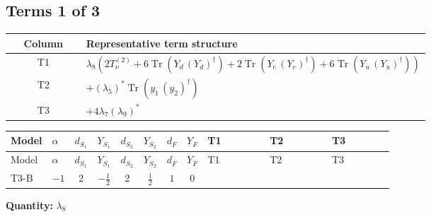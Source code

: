 \documentclass[8pt]{article}
\begin{document}
\begin{landscape}
\subsection*{Terms 1 of 3}
\begin{center}
\begin{tabular}{@{}c >{\raggedright\arraybackslash}p{0.82\linewidth}@{}}
\toprule
Column & Representative term structure \\
\midrule
T1 & \(\displaystyle {\lambda_{8}} (2 T_{\nu}^{(2)}+6 \operatorname{Tr}\!\left({Y_d}\,\left({Y_d}\right)^{\dagger}\right)+2 \operatorname{Tr}\!\left({Y_e}\,\left({Y_e}\right)^{\dagger}\right)+6 \operatorname{Tr}\!\left({Y_u}\,\left({Y_u}\right)^{\dagger}\right))\) \\
\midrule
T2 & \(\displaystyle +\left({\lambda_5}\right)^{*} \operatorname{Tr}\!\left({y_1}\,\left({y_2}\right)^{\dagger}\right)\) \\
\midrule
T3 & \(\displaystyle +4 {\lambda_{7}} \left({\lambda_{9}}\right)^{*}\) \\
\midrule
\bottomrule
\end{tabular}
\end{center}
\smallskip
\tiny
\begin{longtable}{@{}llcccccc >{\raggedright\arraybackslash}p{0.21\linewidth} >{\raggedright\arraybackslash}p{0.21\linewidth} >{\raggedright\arraybackslash}p{0.21\linewidth}@{}}
\toprule
Model & $\alpha$ & $d_{S_1}$ & $Y_{S_1}$ & $d_{S_2}$ & $Y_{S_2}$ & $d_F$ & $Y_F$ & T1 & T2 & T3 \\
\midrule
\endfirsthead
\toprule
Model & $\alpha$ & $d_{S_1}$ & $Y_{S_1}$ & $d_{S_2}$ & $Y_{S_2}$ & $d_F$ & $Y_F$ & T1 & T2 & T3 \\
\midrule
\endhead
T3-B & $-1$ & $2$ & $-\frac{1}{2}$ & $2$ & $\frac{1}{2}$ & $1$ & $0$ & \scriptsize\adjustbox{max width=\linewidth}{$\begin{gathered} {\lambda_{8}} (2 T_{\nu}^{(2)}+6 \operatorname{Tr}\!\left({Y_d}\,\left({Y_d}\right)^{\dagger}\right)+2 \operatorname{Tr}\!\left({Y_e}\,\left({Y_e}\right)^{\dagger}\right)+6 \operatorname{Tr}\!\left({Y_u}\,\left({Y_u}\right)^{\dagger}\right))\end{gathered}$} & \scriptsize\adjustbox{max width=\linewidth}{$\begin{gathered} +\left({\lambda_5}\right)^{*} \operatorname{Tr}\!\left({y_1}\,\left({y_2}\right)^{\dagger}\right)\end{gathered}$} & \scriptsize\adjustbox{max width=\linewidth}{$\begin{gathered} +4 {\lambda_{7}} \left({\lambda_{9}}\right)^{*}\end{gathered}$} \\
\midrule
\bottomrule
\end{longtable}
\clearpage
\noindent\textbf{Quantity: }$\lambda_{8}$\par\smallskip

\end{landscape}
\end{document}

